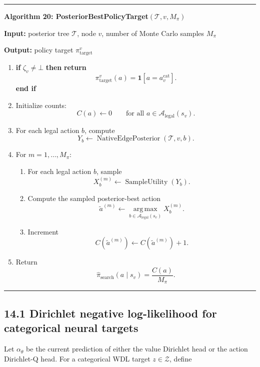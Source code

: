\documentclass[11pt]{article}
\newcommand{\one}{\mathbf{1}}
\newcommand{\argmax}{\operatorname*{arg\,max}}
\newcommand{\Tree}{\mathcal{T}}
\newcommand{\Legal}{\mathcal{A}_{\mathrm{legal}}}
\newcommand{\Z}{\mathcal{Z}}
\newcommand{\SampleUtility}{\operatorname{SampleUtility}}
\newcommand{\NativeEdgePosterior}{\operatorname{NativeEdgePosterior}}
\newenvironment{algorithmblock}[1]
{
  \par\medskip
  \noindent\hrule\par\smallskip
  \noindent\textbf{#1}
  \par\smallskip
}
{
  \par\smallskip\noindent\hrule\par\medskip
}
\newcommand{\Input}{\textbf{Input: }}
\newcommand{\Output}{\textbf{Output: }}
\newcommand{\Return}{\textbf{return }}
\newcommand{\If}{\textbf{if }}
\newcommand{\Then}{\textbf{ then }}
\newcommand{\EndIf}{\textbf{end if}}
\begin{document}
\begin{algorithmblock}{Algorithm 20: PosteriorBestPolicyTarget\((\Tree,v,M_\pi)\)}

\Input posterior tree \(\Tree\), node \(v\), number of Monte Carlo samples \(M_\pi\)

\Output policy target \(\pi_{\mathrm{target}}^v\)

\begin{enumerate}[leftmargin=2em]
  \item \If \(\zeta_v\ne\bot\) \Then \Return
  \[
  \pi_{\mathrm{target}}^v(a)=\one[a=a_v^{\mathrm{cat}}].
  \]
  \EndIf

  \item Initialize counts:
  \[
  C(a)\gets 0
  \qquad
  \text{for all } a\in\Legal(s_v).
  \]

  \item For each legal action \(b\), compute
  \[
  Y_b\gets\NativeEdgePosterior(\Tree,v,b).
  \]

  \item For \(m=1,\ldots,M_\pi\):

  \begin{enumerate}[leftmargin=2em]
    \item For each legal action \(b\), sample
    \[
    X_b^{(m)}\gets\SampleUtility(Y_b).
    \]

    \item Compute the sampled posterior-best action
    \[
    \tilde a^{(m)}
    \gets
    \argmax_{b\in\Legal(s_v)}X_b^{(m)}.
    \]

    \item Increment
    \[
    C(\tilde a^{(m)})
    \gets
    C(\tilde a^{(m)})+1.
    \]
  \end{enumerate}

  \item Return
  \[
  \hat{\pi}_{\mathrm{search}}(a\mid s_v)
  =
  \frac{C(a)}{M_\pi}.
  \]
\end{enumerate}

\end{algorithmblock}

\subsection*{14.1 Dirichlet negative log-likelihood for categorical neural targets}

Let \(\alpha_\theta\) be the current prediction of either the value Dirichlet
head or the action Dirichlet-Q head. For a categorical WDL target \(z\in\Z\),
define
\end{document}
